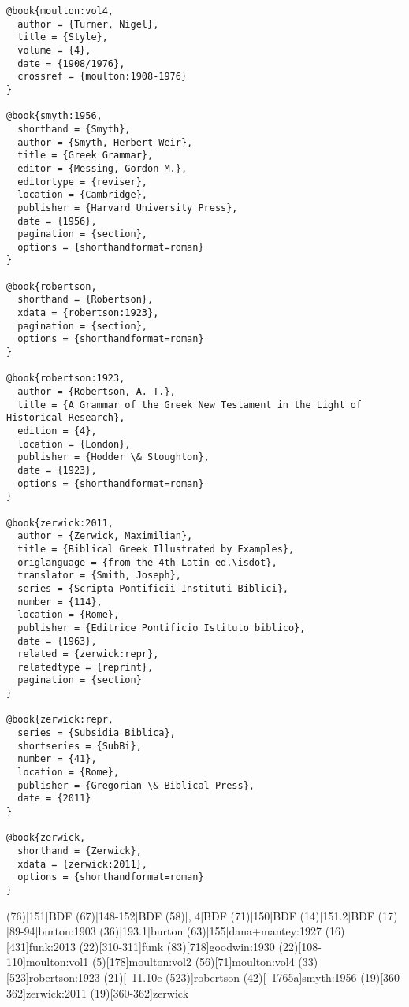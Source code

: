 \documentclass[a4paper]{article}
\begin{document}
\begin{verbatim}
@book{moulton:vol4,
  author = {Turner, Nigel},
  title = {Style},
  volume = {4},
  date = {1908/1976},
  crossref = {moulton:1908-1976}
}

@book{smyth:1956,
  shorthand = {Smyth},
  author = {Smyth, Herbert Weir},
  title = {Greek Grammar},
  editor = {Messing, Gordon M.},
  editortype = {reviser},
  location = {Cambridge},
  publisher = {Harvard University Press},
  date = {1956},
  pagination = {section},
  options = {shorthandformat=roman}
}

@book{robertson,
  shorthand = {Robertson},
  xdata = {robertson:1923},
  pagination = {section},
  options = {shorthandformat=roman}
}

@book{robertson:1923,
  author = {Robertson, A. T.},
  title = {A Grammar of the Greek New Testament in the Light of Historical Research},
  edition = {4},
  location = {London},
  publisher = {Hodder \& Stoughton},
  date = {1923},
  options = {shorthandformat=roman}
}

@book{zerwick:2011,
  author = {Zerwick, Maximilian},
  title = {Biblical Greek Illustrated by Examples},
  origlanguage = {from the 4th Latin ed.\isdot},
  translator = {Smith, Joseph},
  series = {Scripta Pontificii Instituti Biblici},
  number = {114},
  location = {Rome},
  publisher = {Editrice Pontificio Istituto biblico},
  date = {1963},
  related = {zerwick:repr},
  relatedtype = {reprint},
  pagination = {section}
}

@book{zerwick:repr,
  series = {Subsidia Biblica},
  shortseries = {SubBi},
  number = {41},
  location = {Rome},
  publisher = {Gregorian \& Biblical Press},
  date = {2011}
}

@book{zerwick,
  shorthand = {Zerwick},
  xdata = {zerwick:2011},
  options = {shorthandformat=roman}
}
\end{verbatim}

\examplecite(76)[151]{BDF}
\examplecite(67)[148-152]{BDF}
\examplecite(58)[, 4]{BDF}
\examplecite(71)[150]{BDF}
\examplecite(14)[151.2]{BDF}
\examplecite(17)[89-94]{burton:1903}
\examplecite(36)[193.1]{burton}
\examplecite(63)[155]{dana+mantey:1927}
\examplecite(16)[431]{funk:2013}
\examplecite(22)[310-311]{funk}
\examplecite(83)[718]{goodwin:1930}
\examplecite(22)[108-110]{moulton:vol1}
\examplecite[afull](5)[178]{moulton:vol2}
\examplecite[afull](56)[71]{moulton:vol4}
\examplecite(33)[523]{robertson:1923}
\examplecite(21)[\pno 11.10e \mkbibparens{523}]{robertson}
\examplecite(42)[\pno 1765a]{smyth:1956}
\examplecite(19)[360-362]{zerwick:2011}
\examplecite(19)[360-362]{zerwick}
\exampleabbreviations
\examplebibliography
\end{document}
